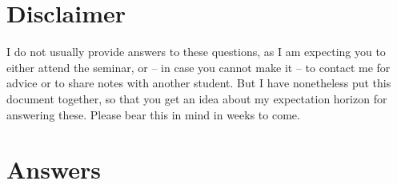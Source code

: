 \documentclass[12pt,a4paper]{article}
\begin{document}
\onehalfspacing

\noindent

\section{Disclaimer}\label{disclaimer}

I do not usually provide answers to these questions, as I am expecting
you to either attend the seminar, or -- in case you cannot make it -- to
contact me for advice or to share notes with another student. But I have
nonetheless put this document together, so that you get an idea about my
expectation horizon for answering these. Please bear this in mind in
weeks to come.

\section{Answers}\label{answers}
\end{document}
